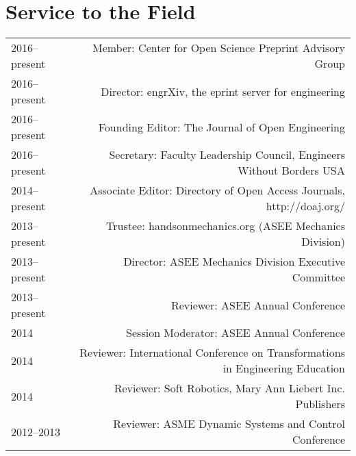 \section*{Service to the Field}
\begin{tabular}{L!{\VRule}R}
2016--present&Member: Center for Open Science Preprint Advisory Group\\
2016--present&Director: engrXiv, the eprint server for engineering\\
2016--present&Founding Editor: The Journal of Open Engineering\\
2016--present&Secretary: Faculty Leadership Council, Engineers Without Borders USA\\
2014--present&Associate Editor: Directory of Open Access Journals, http://doaj.org/\\
2013--present&Trustee: handsonmechanics.org (ASEE Mechanics Division)\\
2013--present&Director: ASEE Mechanics Division Executive Committee\\
2013--present&Reviewer: ASEE Annual Conference\\
2014&Session Moderator: ASEE Annual Conference\\
2014&Reviewer: International Conference on Transformations in Engineering Education\\
2014&Reviewer: Soft Robotics, Mary Ann Liebert Inc. Publishers\\
2012--2013&Reviewer: ASME Dynamic Systems and Control Conference\\
\end{tabular}